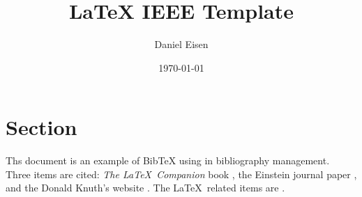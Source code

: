 \documentclass[11pt]{IEEEtran}
\title{{\LaTeX} IEEE Template}
\author{Daniel Eisen}
\date{\today}
\begin{document}
\maketitle
\section{Section}
Ths document is an example of BibTeX using in bibliography management. Three items 
are cited: \textit{The \LaTeX\ Companion} book \cite{latexcompanion}, the Einstein
journal paper \cite{einstein}, and the Donald Knuth's website \cite{knuthwebsite}. 
The \LaTeX\ related items are \cite{latexcompanion, einstein, knuthwebsite}. 

\newpage
\nocite{*}


\end{document}

